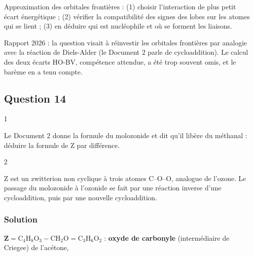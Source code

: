\documentclass[11pt,a4paper]{article}
\newcommand{\equationajustee}[1]{%
  \sbox{\boiteequation}{$\displaystyle #1$}%
  \ifdim\wd\boiteequation>\linewidth
    \[\resizebox{\linewidth}{!}{\usebox{\boiteequation}}\]%
  \else
    \[#1\]%
  \fi}
\begin{document}
\begin{methode}

Approximation des orbitales frontières : (1) choisir l'interaction de plus petit écart énergétique ; (2) vérifier la compatibilité des signes des lobes sur les atomes qui se lient ; (3) en déduire qui est nucléophile et où se forment les liaisons.

\end{methode}

\begin{jury}

Rapport 2026 : la question visait à réinvestir les orbitales frontières par analogie avec la réaction de Diels-Alder (le Document 2 parle de cycloaddition). Le calcul des deux écarts HO-BV, compétence attendue, a été trop souvent omis, et le barème en a tenu compte.

\end{jury}

\hypertarget{question-14}{%
\subsection{Question 14}\label{question-14}}

\begin{indication}{1}

Le Document 2 donne la formule du molozonide et dit qu'il libère du méthanal : déduire la formule de Z par différence.

\end{indication}

\begin{indication}{2}

Z est un zwitterion non cyclique à trois atomes C--O--O, analogue de l'ozone. Le passage du molozonide à l'ozonide se fait par une réaction inverse d'une cycloaddition, puis par une nouvelle cycloaddition.

\end{indication}

\hypertarget{solution-13}{%
\subsubsection{Solution}\label{solution-13}}

\(\mathbf Z=\mathrm{C_4H_8O_3}-\mathrm{CH_2O}=\mathrm{C_3H_6O_2}\) : \textbf{oxyde de carbonyle} (intermédiaire de Criegee) de l'acétone,

\equationajustee{(\mathrm{CH_3})_2\mathrm{C}{=}\overset{+}{\mathrm{O}}{-}\mathrm{O^-}\;\longleftrightarrow\;(\mathrm{CH_3})_2\overset{+}{\mathrm{C}}{-}\mathrm{O}{-}\mathrm{O^-}}
\end{document}
